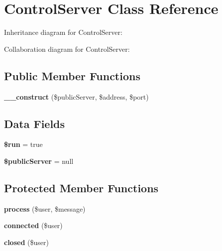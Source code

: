 \hypertarget{class_lora_1_1_api_1_1_control_server}{}\section{Control\+Server Class Reference}
\label{class_lora_1_1_api_1_1_control_server}


Inheritance diagram for Control\+Server\+:


Collaboration diagram for Control\+Server\+:
\subsection*{Public Member Functions}
\begin{DoxyCompactItemize}
\item 
\mbox{\label{class_lora_1_1_api_1_1_control_server_a038654e8959a00da1dcaab1789a8a73f}} 
{\bfseries \+\_\+\+\_\+construct} (\$public\+Server, \$address, \$port)
\end{DoxyCompactItemize}
\subsection*{Data Fields}
\begin{DoxyCompactItemize}
\item 
\mbox{\label{class_lora_1_1_api_1_1_control_server_a1d6ddc9c52e0994f2ec85eb34cc1b1cf}} 
{\bfseries \$run} = true
\item 
\mbox{\label{class_lora_1_1_api_1_1_control_server_a2543b9ff8834fe7f10c97240667dd121}} 
{\bfseries \$public\+Server} = null
\end{DoxyCompactItemize}
\subsection*{Protected Member Functions}
\begin{DoxyCompactItemize}
\item 
\mbox{\label{class_lora_1_1_api_1_1_control_server_a805b6933fa0b69978e35fe94f3884de7}} 
{\bfseries process} (\$user, \$message)
\item 
\mbox{\label{class_lora_1_1_api_1_1_control_server_a3e89014762456a67edbe843811c78736}} 
{\bfseries connected} (\$user)
\item 
\mbox{\label{class_lora_1_1_api_1_1_control_server_aaf6375ec8ee41584a5adcf3d85d73018}} 
{\bfseries closed} (\$user)
\end{DoxyCompactItemize}
